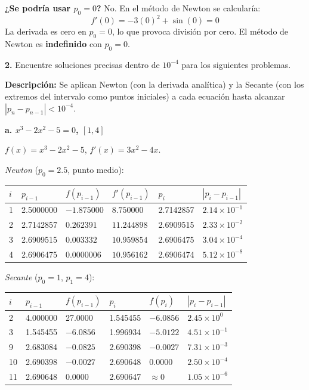 \documentclass[12pt,a4paper]{article}
\begin{document}
\textbf{¿Se podr\'ia usar $p_0 = 0$?} No. En el m\'etodo de Newton se calcular\'ia:
\[
f'(0) = -3(0)^2 + \sin(0) = 0
\]
La derivada es cero en $p_0 = 0$, lo que provoca divisi\'on por cero. El m\'etodo de Newton es \textbf{indefinido} con $p_0 = 0$.

\vspace{0.4cm}

\textbf{2.} Encuentre soluciones precisas dentro de $10^{-4}$ para los siguientes problemas.

\textbf{Descripci\'on:} Se aplican Newton (con la derivada anal\'itica) y la Secante (con los extremos del intervalo como puntos iniciales) a cada ecuaci\'on hasta alcanzar $|p_n - p_{n-1}| < 10^{-4}$.

\textbf{a. $x^3 - 2x^2 - 5 = 0$, $[1, 4]$}

$f(x) = x^3 - 2x^2 - 5$, \quad $f'(x) = 3x^2 - 4x$.

\textit{Newton} ($p_0 = 2.5$, punto medio):

\begin{center}\small
\begin{tabular}{C{0.5cm}C{2.5cm}C{2.5cm}C{2.5cm}C{2.5cm}C{1.8cm}}
\toprule
$i$ & $p_{i-1}$ & $f(p_{i-1})$ & $f'(p_{i-1})$ & $p_i$ & $|p_i - p_{i-1}|$ \\
 & 2.5000000 & $-1.875000$ & $8.750000$ & 2.7142857 & $2.14\times10^{-1}$ \\
2 & 2.7142857 & $0.262391$ & $11.244898$ & 2.6909515 & $2.33\times10^{-2}$ \\
3 & 2.6909515 & $0.003332$ & $10.959854$ & 2.6906475 & $3.04\times10^{-4}$ \\
4 & 2.6906475 & $0.0000006$ & $10.956162$ & 2.6906474 & $5.12\times10^{-8}$ \\
\bottomrule
\end{tabular}
\end{center}

\textit{Secante} ($p_0=1$, $p_1=4$):

\begin{center}\small
\begin{tabular}{C{0.4cm}C{2.2cm}C{2.2cm}C{2.2cm}C{2.2cm}C{1.8cm}}
\toprule
$i$ & $p_{i-1}$ & $f(p_{i-1})$ & $p_i$ & $f(p_i)$ & $|p_i-p_{i-1}|$\\
 & 4.000000 & 27.0000 & 1.545455 & $-6.0856$ & $2.45\times10^0$ \\
3 & 1.545455 & $-6.0856$ & 1.996934 & $-5.0122$ & $4.51\times10^{-1}$ \\
9 & 2.683084 & $-0.0825$ & 2.690398 & $-0.0027$ & $7.31\times10^{-3}$ \\
10 & 2.690398 & $-0.0027$ & 2.690648 & $0.0000$ & $2.50\times10^{-4}$ \\
11 & 2.690648 & $0.0000$ & 2.690647 & $\approx0$ & $1.05\times10^{-6}$ \\
\bottomrule
\end{tabular}
\end{center}
\end{document}

